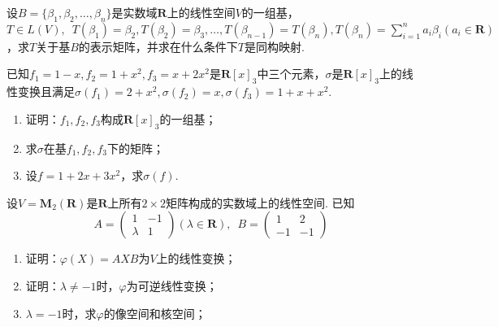 \begin{exercise}


    \begin{exgroup}[2] %
        \item 设$B=\{\beta_1,\beta_2,\ldots,\beta_n\}$是实数域$\mathbf{R}$上的线性空间$V$的一组基，$T \in L(V),\enspace T(\beta_1)=\beta_2,T(\beta_2)=\beta_3,\ldots,T(\beta_{n-1})=T(\beta_n),T(\beta_n)=\displaystyle\sum_{i=1}^{n}a_i\beta_i(a_i \in \mathbf{R})$，求$T$关于基$B$的表示矩阵，并求在什么条件下$T$是同构映射.

        \item 已知$f_1=1-x,f_2=1+x^2,f_3=x+2x^2$是$\mathbf{R}[x]_3$中三个元素，$\sigma$是$\mathbf{R}[x]_3$上的线性变换且满足$\sigma(f_1)=2+x^2,\sigma(f_2)=x,\sigma(f_3)=1+x+x^2$.
        \begin{enumerate}
            \item 证明：$f_1,f_2,f_3$构成$\mathbf{R}[x]_3$的一组基；

            \item 求$\sigma$在基$f_1,f_2,f_3$下的矩阵；

            \item 设$f=1+2x+3x^2$，求$\sigma(f)$.
        \end{enumerate}

        \item 设$V=\mathbf{M}_2(\mathbf{R})$是$\mathbf{R}$上所有$2 \times 2$矩阵构成的实数域上的线性空间. 已知
        \[A=\begin{pmatrix}1 & -1 \\ \lambda & 1 \end{pmatrix}(\lambda \in \mathbf{R}),\enspace B=\begin{pmatrix}1 & 2 \\ -1 & -1 \end{pmatrix}\]
        \begin{enumerate}
            \item 证明：$\varphi(X)=AXB$为$V$上的线性变换；

            \item 证明：$\lambda\neq-1$时，$\varphi$为可逆线性变换；

            \item \label{item:7:B:1}
                  $\lambda=-1$时，求$\varphi$的像空间和核空间；


\end{enumerate}
\end{exgroup}
\end{exercise}
